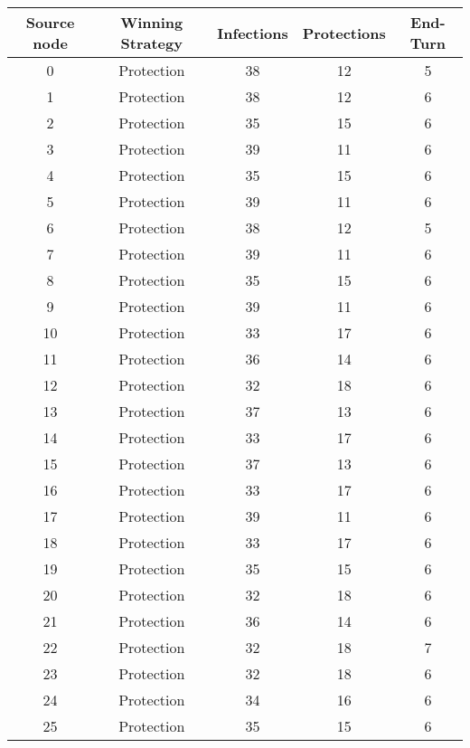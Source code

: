 \documentclass[results.tex]{subfiles}
\begin{document}
\begin{center}
  \begin{tabular}{| c || c | c | c | c |}
    \hline
    {\bfseries Source node} & {\bfseries Winning Strategy} & {\bfseries Infections} & {\bfseries Protections} & {\bfseries End-Turn} \\  %
    \hline\hline
    0 & Protection & 38 & 12 & 5 \\ 
    \hline
    1 & Protection & 38 & 12 & 6 \\ 
    \hline
    2 & Protection & 35 & 15 & 6 \\ 
    \hline
    3 & Protection & 39 & 11 & 6 \\ 
    \hline
    4 & Protection & 35 & 15 & 6 \\ 
    \hline
    5 & Protection & 39 & 11 & 6 \\ 
    \hline
    6 & Protection & 38 & 12 & 5 \\ 
    \hline
    7 & Protection & 39 & 11 & 6 \\ 
    \hline
    8 & Protection & 35 & 15 & 6 \\ 
    \hline
    9 & Protection & 39 & 11 & 6 \\ 
    \hline
    10 & Protection & 33 & 17 & 6 \\ 
    \hline
    11 & Protection & 36 & 14 & 6 \\ 
    \hline
    12 & Protection & 32 & 18 & 6 \\ 
    \hline
    13 & Protection & 37 & 13 & 6 \\ 
    \hline
    14 & Protection & 33 & 17 & 6 \\ 
    \hline
    15 & Protection & 37 & 13 & 6 \\ 
    \hline
    16 & Protection & 33 & 17 & 6 \\ 
    \hline
    17 & Protection & 39 & 11 & 6 \\ 
    \hline
    18 & Protection & 33 & 17 & 6 \\ 
    \hline
    19 & Protection & 35 & 15 & 6 \\ 
    \hline
    20 & Protection & 32 & 18 & 6 \\ 
    \hline
    21 & Protection & 36 & 14 & 6 \\ 
    \hline
    22 & Protection & 32 & 18 & 7 \\ 
    \hline
    23 & Protection & 32 & 18 & 6 \\ 
    \hline
    24 & Protection & 34 & 16 & 6 \\ 
    \hline
    25 & Protection & 35 & 15 & 6 \\ 

\end{tabular}
\end{center}
\end{document}
